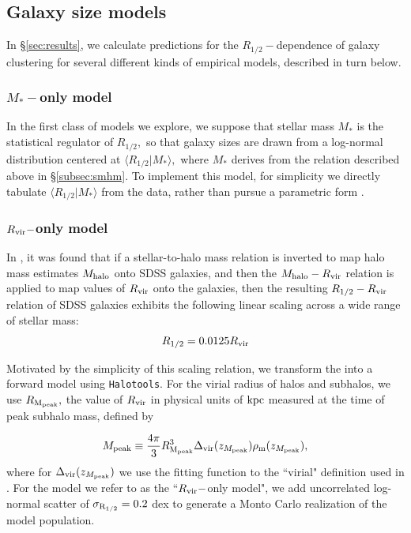 \documentclass[usenatbib,usegraphicx,letterpaper]{mn2e}
\newcommand{\beq}{\begin{equation}}
\newcommand{\eeq}{\end{equation}}
\newcommand{\rhalf}{R_{1/2}}
\newcommand{\sigmarhalf}{\sigma_{\rm R_{1/2}}}
\newcommand{\mstar}{M_{\ast}}
\newcommand{\mpeak}{M_{\rm peak}}
\newcommand{\zpeak}{z_{M_{\rm peak}}}
\newcommand{\mhalo}{M_{\rm halo}}
\newcommand{\rvir}{R_{\rm vir}}
\newcommand{\rmpeak}{R_{\rm M_{peak}}}
\newcommand{\kpc}{{\rm kpc}}
\begin{document}
\subsection{Galaxy size models}
\label{subsec:model}

In \S\ref{sec:results}, we calculate predictions for the $\rhalf-$dependence of galaxy clustering for several different kinds of empirical models, described in turn below.


\subsubsection{$\mstar-$only model}
\label{subsubsec:mstaronlymodel}

In the first class of models we explore, we suppose that stellar mass $\mstar$ is the statistical regulator of $\rhalf,$ so that galaxy sizes are drawn from a log-normal distribution centered at $\langle\rhalf\vert\mstar\rangle,$ where $\mstar$ derives from the \citet{moster_etal13} relation described above in \S\ref{subsec:smhm}. To implement this model, for simplicity we directly tabulate $\langle\rhalf\vert\mstar\rangle$ from the data, rather than pursue a parametric form \citep[see, e.g.,][]{zhang_yang17}. 

\subsubsection{$\rvir-$only model}
\label{subsubsec:rvirmodel}

In \citet{kravtsov13}, it was found that if a stellar-to-halo mass relation is inverted to map halo mass estimates $\mhalo$ onto SDSS galaxies, and then the $\mhalo-\rvir$ relation is applied to map values of $\rvir$ onto the galaxies, then the resulting $\rhalf-\rvir$ relation of SDSS galaxies exhibits the following linear scaling across a wide range of stellar mass:
\beq
\label{eq:fiducial_model}
\rhalf = 0.0125\rvir
\eeq

Motivated by the simplicity of this scaling relation, we transform the \citet{kravtsov13} into a forward model using {\tt Halotools}. For the virial radius of halos and subhalos, we use $\rmpeak,$ the value of $\rvir$ in physical units of $\kpc$ measured at the time of peak subhalo mass, defined by 

\beq
\mpeak\equiv\frac{4\pi}{3}\rmpeak^{3}\Delta_{\rm vir}(\zpeak)\rho_{\rm m}(\zpeak), 
\eeq
where for $\Delta_{\rm vir}(\zpeak)$ we use the fitting function to the ``virial" definition used in \citet{bryan_norman98}. For the model we refer to as the ``$\rvir-$only model", we add uncorrelated log-normal scatter of $\sigmarhalf=0.2$ dex to generate a Monto Carlo realization of the model population. 
\end{document}
